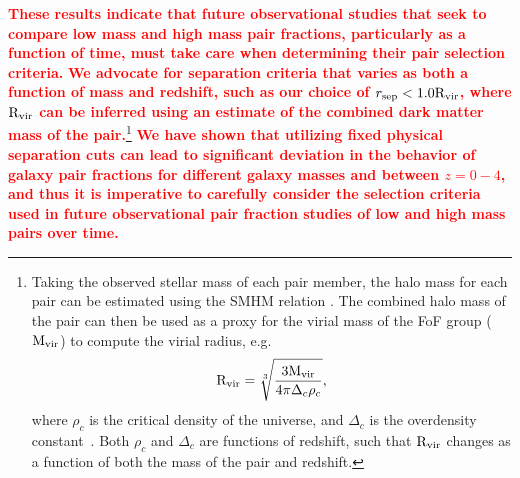 \documentclass[linenumbers,twocolumn]{aastex631}
\newcommand{\add}[1]{\textcolor{red}{\textbf{#1}}}
\newcommand{\Rvir}{\ensuremath{\rm R_{vir}}}
\begin{document}

    \add{These results indicate that future observational studies that seek to compare low mass and high mass pair fractions, particularly as a function of time, must take care when determining their pair selection criteria.} 
    \add{We advocate for separation criteria that varies as both a function of mass and redshift, such as our choice of $r_{\mathrm{sep}} < 1.0\Rvir$, where $\Rvir$ can be inferred using an estimate of the combined dark matter mass of the pair.}\footnote{Taking the observed stellar mass of each pair member, the halo mass for each pair can be estimated using the SMHM relation \citep[e.g.,][]{Moster2013}. 
    The combined halo mass of the pair can then be used as a proxy for the virial mass of the FoF group ($\rm M_{vir}$) to compute the virial radius, e.g. 
    \begin{equation}\label{eq}
    \Rvir = \sqrt[3]{\frac{3\rm M_{vir}}{4\pi \Delta_{c}\rho_{c}}},
    \end{equation}
    where $\rho_c$ is the critical density of the universe, and $\Delta_{c}$ is the overdensity constant~\citep[see][]{BinneyTremaine2008}. 
    Both $\rho_c$ and $\Delta_{c}$ are functions of redshift, such that $\Rvir$ changes as a function of both the mass of the pair and redshift.}
    \add{We have shown that utilizing fixed physical separation cuts can lead to significant deviation in the behavior of galaxy pair fractions for different galaxy masses and between $z=0-4$, and thus it is imperative to carefully consider the selection criteria used in future observational pair fraction studies of low and high mass pairs over time.}
    
\end{document}
